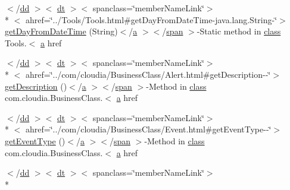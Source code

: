 \begin{DoxyCompactItemize}
\item 
$<$/\hyperlink{stylesheet_8css_a47f4718a86835a7771ec592ece845221}{dd} $>$$<$ \hyperlink{stylesheet_8css_a107565fb4039d33b041380d6e0ea1d80}{dt} $>$$<$ spanclass=\char`\"{}member\-Name\-Link\char`\"{}$>$\\*
$<$ ahref=\char`\"{}../Tools/Tools.\-html\#get\-Day\-From\-Date\-Time-\/java.\-lang.\-String-\/\char`\"{}$>$ \hyperlink{index-7_8html_a9bf8a548762cf6f5debcba6f0317391d}{get\-Day\-From\-Date\-Time} (String)$<$/\hyperlink{style_8css_a5e8981582017bb8b84c21f148345d1f7}{a} $>$$<$/\hyperlink{stylesheet_8css_a8343996ebcf16220b04e54659aac31cc}{span} $>$-\/Static method in \hyperlink{_tools_8html_acf06f836132665ba8114f5a414c2403f}{class} Tools.$<$ \hyperlink{style_8css_a5e8981582017bb8b84c21f148345d1f7}{a} href
\item 
$<$/\hyperlink{stylesheet_8css_a47f4718a86835a7771ec592ece845221}{dd} $>$$<$ \hyperlink{stylesheet_8css_a107565fb4039d33b041380d6e0ea1d80}{dt} $>$$<$ spanclass=\char`\"{}member\-Name\-Link\char`\"{}$>$\\*
$<$ ahref=\char`\"{}../com/cloudia/Business\-Class/Alert.\-html\#get\-Description-\/-\/\char`\"{}$>$ \hyperlink{index-7_8html_ab6d3c90ffa518bba408317e133cb4fb1}{get\-Description} ()$<$/\hyperlink{style_8css_a5e8981582017bb8b84c21f148345d1f7}{a} $>$$<$/\hyperlink{stylesheet_8css_a8343996ebcf16220b04e54659aac31cc}{span} $>$-\/Method in \hyperlink{_tools_8html_acf06f836132665ba8114f5a414c2403f}{class} com.\-cloudia.\-Business\-Class.$<$ \hyperlink{style_8css_a5e8981582017bb8b84c21f148345d1f7}{a} href
\item 
$<$/\hyperlink{stylesheet_8css_a47f4718a86835a7771ec592ece845221}{dd} $>$$<$ \hyperlink{stylesheet_8css_a107565fb4039d33b041380d6e0ea1d80}{dt} $>$$<$ spanclass=\char`\"{}member\-Name\-Link\char`\"{}$>$\\*
$<$ ahref=\char`\"{}../com/cloudia/Business\-Class/Event.\-html\#get\-Event\-Type-\/-\/\char`\"{}$>$ \hyperlink{index-7_8html_a4d4072cc13035bf167769ebbbc7e58c9}{get\-Event\-Type} ()$<$/\hyperlink{style_8css_a5e8981582017bb8b84c21f148345d1f7}{a} $>$$<$/\hyperlink{stylesheet_8css_a8343996ebcf16220b04e54659aac31cc}{span} $>$-\/Method in \hyperlink{_tools_8html_acf06f836132665ba8114f5a414c2403f}{class} com.\-cloudia.\-Business\-Class.$<$ \hyperlink{style_8css_a5e8981582017bb8b84c21f148345d1f7}{a} href
\item 
$<$/\hyperlink{stylesheet_8css_a47f4718a86835a7771ec592ece845221}{dd} $>$$<$ \hyperlink{stylesheet_8css_a107565fb4039d33b041380d6e0ea1d80}{dt} $>$$<$ spanclass=\char`\"{}member\-Name\-Link\char`\"{}$>$\\*
$$
\end{DoxyCompactItemize}
